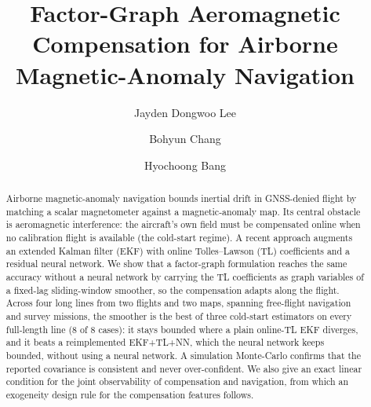 \documentclass{IEEEtaes}
\begin{document}
\title{Factor-Graph Aeromagnetic Compensation for Airborne Magnetic-Anomaly Navigation}

\author{Jayden Dongwoo Lee}

\author{Bohyun Chang}

\author{Hyochoong Bang}




\editor{}
\supplementary{}

\maketitle

\begin{abstract}
Airborne magnetic-anomaly navigation bounds inertial drift in GNSS-denied flight
by matching a scalar magnetometer against a magnetic-anomaly map. Its central
obstacle is aeromagnetic interference: the aircraft's own field must be
compensated online when no calibration flight is available (the cold-start
regime). A recent approach augments an extended Kalman filter (EKF) with online
Tolles--Lawson (TL) coefficients and a residual neural network. We show that a
factor-graph formulation reaches the same accuracy without a neural network by
carrying the TL coefficients as graph variables of a fixed-lag sliding-window
smoother, so the compensation adapts along the flight. Across four long lines from
two flights and two maps, spanning free-flight navigation and survey
missions, the smoother is the best of three
cold-start estimators on every full-length line (\num{8} of \num{8} cases): it stays bounded where a plain
online-TL EKF diverges, and it beats a reimplemented EKF+TL+NN, which the neural
network keeps bounded, without using a neural network. A simulation Monte-Carlo
confirms that the reported covariance is consistent and never over-confident. We
also give an exact linear condition for the joint observability of compensation and
navigation, from which an exogeneity design rule for the compensation features
follows.
\end{abstract}
\end{document}
